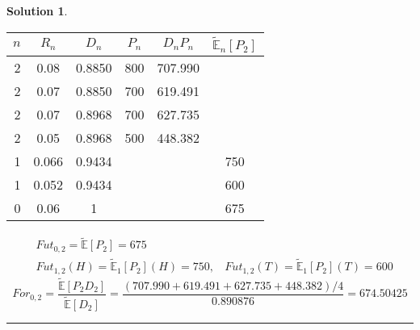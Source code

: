 \documentclass[a4paper, 10pt]{article}
\theoremstyle{definition}
\theoremstyle{hSol}
\newtheorem*{solution}{Solution}
\begin{document}
\begin{solution}
\begin{table}[h]
\begin{tabular}{|r|ccccc|}
\hline
$n$ & $R_n$ & $D_{n}$ & $P_n$ & $D_{n}P_n$ & $\tilde{\mathbb{E}}_{n}\left[P_2\right]$\\ 
\hline
2 & 0.08 & 0.8850 & 800 & 707.990&\\
2 & 0.07 & 0.8850 & 700 & 619.491&\\
2 & 0.07 & 0.8968 & 700 & 627.735&\\
2 & 0.05 & 0.8968 & 500 & 448.382&\\
\hline
1 & 0.066 & 0.9434 & && 750 \\
1 & 0.052 & 0.9434 & && 600 \\
\hline
0 & 0.06 & 1 & && 675 \\
\hline
\end{tabular}
\label{tab:ff2}
\end{table}
\begin{equation}
  \begin{split}
    &Fut_{0,2} = \tilde{\mathbb{E}}\left[P_2\right] = 675\\
    &Fut_{1,2}(H) = \tilde{\mathbb{E}}_1\left[P_2\right](H) = 750,~~~~Fut_{1,2}(T) = \tilde{\mathbb{E}}_1\left[P_2\right](T) = 600
  \end{split}
\end{equation}
$$
For_{0,2} = \frac{\tilde{\mathbb{E}}\left[P_2D_2\right]}{\tilde{\mathbb{E}}\left[D_2\right]} = \frac{(707.990+619.491+627.735+448.382)/4}{0.890876} = 674.50425
$$
\end{solution}

\noindent\rule{16cm}{0.4pt}
\end{document}

